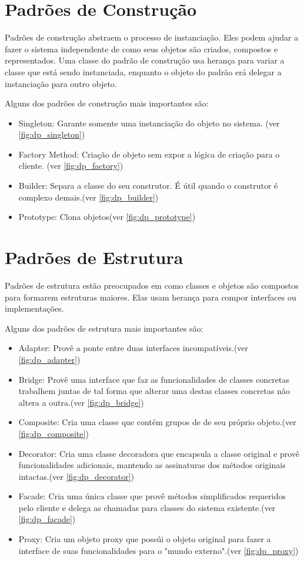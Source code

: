 \section{Padrões de Construção}
Padrões de construção abstraem o processo de instanciação. Eles podem ajudar a fazer o sistema independente de como seus objetos são criados, compostos e representados. Uma classe do padrão de construção usa herança para variar a classe que está sendo instanciada, enquanto o objeto do padrão erá delegar a instanciação para outro objeto.

Alguns dos padrões de construção mais importantes são:
\begin{itemize}
	\item Singleton: Garante somente uma instanciação do objeto no sistema.  (ver \autoref{fig:dp_singleton})
	\item Factory Method: Criação de objeto sem expor a lógica de criação para o cliente. (ver \autoref{fig:dp_factory})
	\item Builder: Separa a classe do seu construtor. É útil quando o construtor é complexo demais.(ver \autoref{fig:dp_builder})
	\item Prototype: Clona objetos(ver \autoref{fig:dp_prototype})
\end{itemize}

\section{Padrões de Estrutura}
Padrões de estrutura estão preocupados em como classes e objetos são compostos para formarem estruturas maiores. Elas usam herança para compor interfaces ou implementações. 

Alguns dos padrões de estrutura mais importantes são:
\begin{itemize}
	\item Adapter: Provê a ponte entre duas interfaces incompatíveis.(ver \autoref{fig:dp_adapter})
	\item Bridge: Provê uma interface que faz as funcionalidades de classes concretas trabalhem juntas de tal forma que alterar uma destas classes concretas não altera a outra.(ver \autoref{fig:dp_bridge})
	\item Composite: Cria uma classe que contém grupos de de seu próprio objeto.(ver \autoref{fig:dp_composite})
	\item Decorator: Cria uma classe decoradora que encapsula a classe original e provê funcionalidades adicionais, mantendo as assinaturas dos métodos originais intactas.(ver \autoref{fig:dp_decorator})
	\item Facade: Cria uma única classe que provê métodos simplificados requeridos pelo cliente e delega as chamadas para classes do sistema existente.(ver \autoref{fig:dp_facade})
	\item Proxy: Cria um objeto proxy que possúi o objeto original para fazer a interface de suas funcionalidades para o "mundo externo".(ver \autoref{fig:dp_proxy})
\end{itemize}

